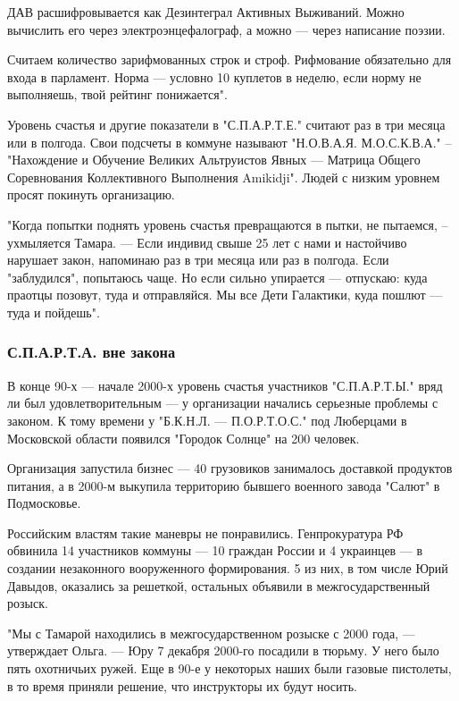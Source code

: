 ДАВ расшифровывается как Дезинтеграл Активных Выживаний. Можно вычислить его
через электроэнцефалограф, а можно --- через написание поэзии. 

Считаем количество зарифмованных строк и строф. Рифмование обязательно для
входа в парламент. Норма --- условно 10 куплетов в неделю, если норму не
выполняешь, твой рейтинг понижается".

Уровень счастья и другие показатели в "С.П.А.Р.Т.Е." считают раз в три месяца
или в полгода. Свои подсчеты в коммуне называют "Н.О.В.А.Я. М.О.С.К.В.А." –
"Нахождение и Обучение Великих Альтруистов Явных --- Матрица Общего Соревнования
Коллективного Выполнения Amikidji". Людей с низким уровнем просят покинуть
организацию.

"Когда попытки поднять уровень счастья превращаются в пытки, не пытаемся, –
ухмыляется Тамара. --- Если индивид свыше 25 лет с нами и настойчиво нарушает
закон, напоминаю раз в три месяца или раз в полгода. Если "заблудился",
попытаюсь чаще. Но если сильно упирается --- отпускаю: куда праотцы позовут, туда
и отправляйся. Мы все Дети Галактики, куда пошлют --- туда и пойдешь".

\subsubsection{С.П.А.Р.Т.А. вне закона}

В конце 90-х --- начале 2000-х уровень счастья участников "С.П.А.Р.Т.Ы." вряд ли
был удовлетворительным --- у организации начались серьезные проблемы с законом. К
тому времени у "Б.К.Н.Л. --- П.О.Р.Т.О.С." под Люберцами в Московской области
появился "Городок Солнце" на 200 человек. 

Организация запустила бизнес --- 40 грузовиков занималось доставкой продуктов
питания, а в 2000-м выкупила территорию бывшего военного завода "Салют" в
Подмосковье.

Российским властям такие маневры не понравились. Генпрокуратура РФ обвинила 14
участников коммуны --- 10 граждан России и 4 украинцев --- в создании незаконного
вооруженного формирования. 5 из них, в том числе Юрий Давыдов, оказались за
решеткой, остальных объявили в межгосударственный розыск.

"Мы с Тамарой находились в межгосударственном розыске с 2000 года, --- утверждает
Ольга. --- Юру 7 декабря 2000-го посадили в тюрьму. У него было пять охотничьих
ружей. Еще в 90-е у некоторых наших были газовые пистолеты, в то время приняли
решение, что инструкторы их будут носить.

